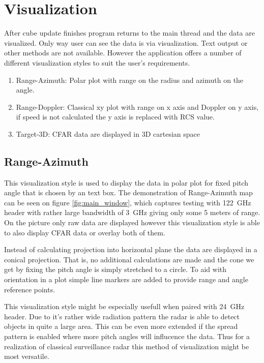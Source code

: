 \section{Visualization}

After cube update finishes program returns to the main thread and the data are visualized.
Only way user can see the data is via visualization.
Text output or other methods are not available.
However the application offers a number of different visualization styles to suit the user's requirements.

\begin{enumerate}
	\item Range-Azimuth: Polar plot with range on the radius and azimuth on the angle.
	\item Range-Doppler: Classical xy plot with range on x axis and Doppler on y axis, if speed is not calculated the y axis is replaced with RCS value.
	\item Target-3D: CFAR data are displayed in 3D cartesian space
\end{enumerate}

\subsection{Range-Azimuth}

This visualization style is used to display the data in polar plot for fixed pitch angle that is chosen by an text box.
The demonstration of Range-Azimuth map can be seen on figure \ref{fig:main_window}, which captures testing with 122~GHz header with rather large bandwidth of 3~GHz giving only some 5 meters of range.
On the picture only raw data are displayed however this visualization style is able to also display CFAR data or overlay both of them.

Instead of calculating projection into horizontal plane the data are displayed in a conical projection.
That is, no additional calculations are made and the cone we get by fixing the pitch angle is simply stretched to a circle.
To aid with orientation in a plot simple line markers are added to provide range and angle reference points.

This visualization style might be especially usefull when paired with 24~GHz header.
Due to it's rather wide radiation pattern the radar is able to detect objects in quite a large area.
This can be even more extended if the spread pattern is enabled where more pitch angles will influcence the data.
Thus for a realization of classical surveillance radar this method of visualization might be most versatile.

